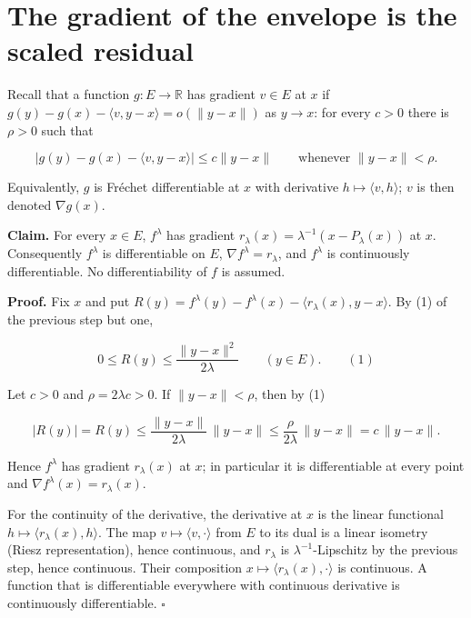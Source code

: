 \documentclass[11pt,a4paper]{article}
\begin{document}
\section{\texorpdfstring{The gradient of the envelope is the scaled residual}{The gradient of the envelope is the scaled residual}}


Recall that a function \(g:E\to\mathbb R\) has gradient \(v\in E\) at \(x\) if \(g(y)-g(x)-\langle v,y-x\rangle=o(\|y-x\|)\) as \(y\to x\): for every \(c>0\) there is \(\rho>0\) such that


\[|g(y)-g(x)-\langle v,y-x\rangle|\le c\|y-x\|\qquad\text{whenever }\|y-x\|<\rho.\]


Equivalently, \(g\) is Fréchet differentiable at \(x\) with derivative \(h\mapsto\langle v,h\rangle\); \(v\) is then denoted \(\nabla g(x)\).




\textbf{Claim.} For every \(x\in E\), \(f^\lambda\) has gradient \(r_\lambda(x)=\lambda^{-1}(x-P_\lambda(x))\) at \(x\). Consequently \(f^\lambda\) is differentiable on \(E\), \(\nabla f^\lambda=r_\lambda\), and \(f^\lambda\) is continuously differentiable. No differentiability of \(f\) is assumed.




\textbf{Proof.} Fix \(x\) and put \(R(y)=f^\lambda(y)-f^\lambda(x)-\langle r_\lambda(x),y-x\rangle\). By (1) of the previous step but one,


\[0\le R(y)\le\frac{\|y-x\|^2}{2\lambda}\qquad(y\in E).\qquad(1)\]


Let \(c>0\) and \(\rho=2\lambda c>0\). If \(\|y-x\|<\rho\), then by (1)


\[|R(y)|=R(y)\le\frac{\|y-x\|}{2\lambda}\,\|y-x\|\le\frac{\rho}{2\lambda}\,\|y-x\|=c\,\|y-x\|.\]


Hence \(f^\lambda\) has gradient \(r_\lambda(x)\) at \(x\); in particular it is differentiable at every point and \(\nabla f^\lambda(x)=r_\lambda(x)\).




For the continuity of the derivative, the derivative at \(x\) is the linear functional \(h\mapsto\langle r_\lambda(x),h\rangle\). The map \(v\mapsto\langle v,\cdot\rangle\) from \(E\) to its dual is a linear isometry (Riesz representation), hence continuous, and \(r_\lambda\) is \(\lambda^{-1}\)-Lipschitz by the previous step, hence continuous. Their composition \(x\mapsto\langle r_\lambda(x),\cdot\rangle\) is continuous. A function that is differentiable everywhere with continuous derivative is continuously differentiable. \(\square\)
\end{document}

